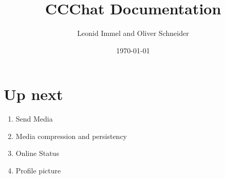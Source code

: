 \documentclass[10pt,a4paper,landscape]{article}
\title{CCChat Documentation}
\date{\today}
\author{Leonid Immel and Oliver Schneider}
\begin{document}
\maketitle
\tableofcontents
\newpage
\section{Up next}
\begin{enumerate}
        \item
                Send Media
        \item
                Media compression and persistency
        \item
                Online Status
        \item 
                Profile picture
\end{enumerate}
\end{document}
